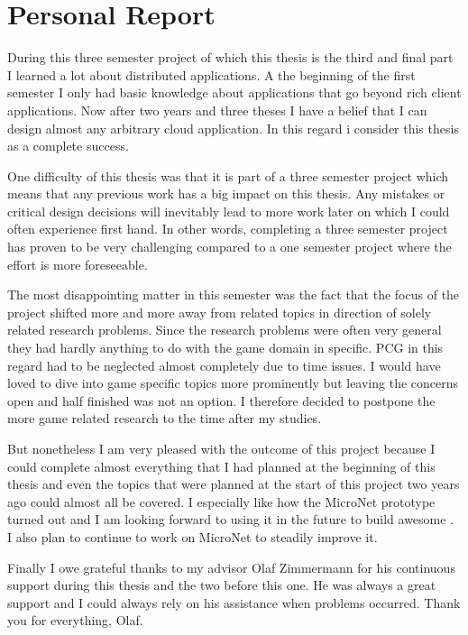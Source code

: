 \chapter{Personal Report}

During this three semester project of which this thesis is the third and final
part I learned a lot about distributed applications. A the beginning of the
first semester I only had basic knowledge about applications that go beyond rich
client applications. Now after two years and three theses I have a belief that
I can design almost any arbitrary cloud application. In this regard i consider
this thesis as a complete success.

One difficulty of this thesis was that it is part of a three semester project
which means that any previous work has a big impact on this thesis. Any mistakes
or critical design decisions will inevitably lead to more work later on which I
could often experience first hand. In other words, completing a three semester
project has proven to be very challenging compared to a one semester project
where the effort is more foreseeable.

The most disappointing matter in this semester was the fact that the focus of
the project shifted more and more away from \og{} related topics in direction of
solely \ms{} related research problems. Since the research problems were often
very general they had hardly anything to do with the game domain in specific.
PCG in this regard had to be neglected almost completely due to time issues. I
would have loved to dive into game specific topics more prominently but leaving
the \ms{} concerns open and half finished was not an option. I therefore decided
to postpone the more game related research to the time after my studies.

But nonetheless I am very pleased with the outcome of this project because I
could complete almost everything that I had planned at the beginning of
this thesis and even the topics that were planned at the start of this project two
years ago could almost all be covered. I especially like how the MicroNet
prototype turned out and I am looking forward to using it in the future to build
awesome \ogs{}. I also plan to continue to work on MicroNet to steadily improve
it.

Finally I owe grateful thanks to my advisor Olaf Zimmermann for his
continuous support during this thesis and the two before this one. He was always
a great support and I could always rely on his assistance when problems
occurred. Thank you for everything, Olaf. 
